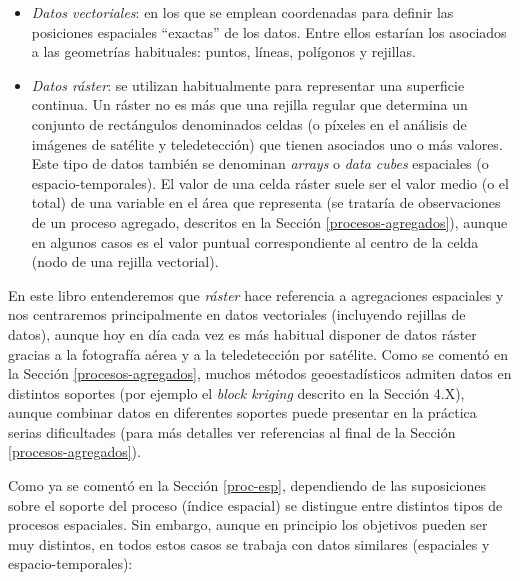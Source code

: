 \documentclass[
  spanish,
]{book}
\theoremstyle{break}
\theoremstyle{definition}
\theoremstyle{definition}
\theoremstyle{definition}
\theoremstyle{definition}
\theoremstyle{remark}
\begin{document}
\begin{itemize}
\item
  \emph{Datos vectoriales}: en los que se emplean coordenadas para definir las posiciones espaciales ``exactas'' de los datos. Entre ellos estarían los asociados a las geometrías habituales: puntos, líneas, polígonos y rejillas.
\item
  \emph{Datos ráster}: se utilizan habitualmente para representar una superficie continua. Un ráster no es más que una rejilla regular que determina un conjunto de rectángulos denominados celdas (o píxeles en el análisis de imágenes de satélite y teledetección) que tienen asociados uno o más valores. Este tipo de datos también se denominan \emph{arrays} o \emph{data cubes} espaciales (o espacio-temporales). El valor de una celda ráster suele ser el valor medio (o el total) de una variable en el área que representa (se trataría de observaciones de un proceso agregado, descritos en la Sección \ref{procesos-agregados}), aunque en algunos casos es el valor puntual correspondiente al centro de la celda (nodo de una rejilla vectorial).
\end{itemize}

En este libro entenderemos que \emph{ráster} hace referencia a agregaciones espaciales y nos centraremos principalmente en datos vectoriales (incluyendo rejillas de datos), aunque hoy en día cada vez es más habitual disponer de datos ráster gracias a la fotografía aérea y a la teledetección por satélite.
Como se comentó en la Sección \ref{procesos-agregados}, muchos métodos geoestadísticos admiten datos en distintos soportes (por ejemplo el \emph{block kriging} descrito en la Sección 4.X), aunque combinar datos en diferentes soportes puede presentar en la práctica serias dificultades (para más detalles ver referencias al final de la Sección \ref{procesos-agregados}).

Como ya se comentó en la Sección \ref{proc-esp}, dependiendo de las suposiciones sobre el soporte del proceso (índice espacial) se distingue entre distintos tipos de procesos espaciales.
Sin embargo, aunque en principio los objetivos pueden ser muy distintos, en todos estos casos se trabaja con datos similares (espaciales y espacio-temporales):
\end{document}
